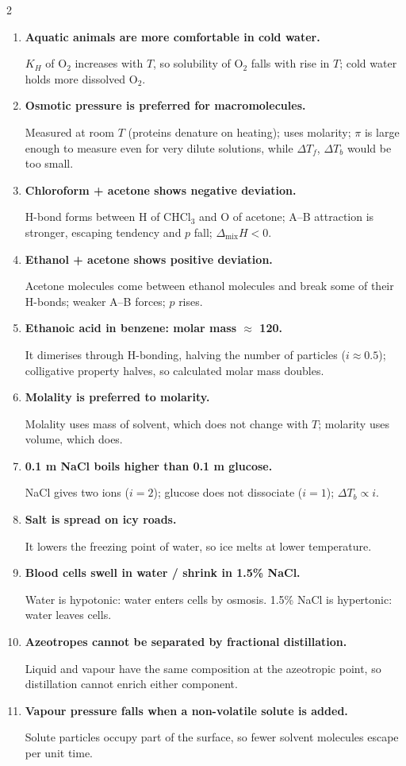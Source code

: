 \documentclass[10pt,a4paper]{extarticle}
\newenvironment{rqlist}{\begin{enumerate}[leftmargin=12pt,label={\sffamily\bfseries\scriptsize\color{uc}\arabic*.},itemsep=1pt]}{\end{enumerate}}
\newcommand{\ans}{\par\hspace*{2pt}{\color{uc}$\hookrightarrow$}\;}
\begin{document}
\begin{multicols}{2}
\begin{rqlist}
\item \textbf{Aquatic animals are more comfortable in cold water.}\ans $K_H$ of O$_2$ increases with $T$, so solubility of O$_2$ falls with rise in $T$; cold water holds more dissolved O$_2$.
\item \textbf{Osmotic pressure is preferred for macromolecules.}\ans Measured at room $T$ (proteins denature on heating); uses molarity; $\pi$ is large enough to measure even for very dilute solutions, while $\Delta T_f$, $\Delta T_b$ would be too small.
\item \textbf{Chloroform + acetone shows negative deviation.}\ans H-bond forms between H of CHCl$_3$ and O of acetone; A--B attraction is stronger, escaping tendency and $p$ fall; $\Delta_\text{mix}H<0$.
\item \textbf{Ethanol + acetone shows positive deviation.}\ans Acetone molecules come between ethanol molecules and break some of their H-bonds; weaker A--B forces; $p$ rises.
\item \textbf{Ethanoic acid in benzene: molar mass $\approx$ 120.}\ans It dimerises through H-bonding, halving the number of particles ($i\approx0.5$); colligative property halves, so calculated molar mass doubles.
\item \textbf{Molality is preferred to molarity.}\ans Molality uses mass of solvent, which does not change with $T$; molarity uses volume, which does.
\item \textbf{0.1 m NaCl boils higher than 0.1 m glucose.}\ans NaCl gives two ions ($i=2$); glucose does not dissociate ($i=1$); $\Delta T_b\propto i$.
\item \textbf{Salt is spread on icy roads.}\ans It lowers the freezing point of water, so ice melts at lower temperature.
\item \textbf{Blood cells swell in water / shrink in 1.5\% NaCl.}\ans Water is hypotonic: water enters cells by osmosis. 1.5\% NaCl is hypertonic: water leaves cells.
\item \textbf{Azeotropes cannot be separated by fractional distillation.}\ans Liquid and vapour have the same composition at the azeotropic point, so distillation cannot enrich either component.
\item \textbf{Vapour pressure falls when a non-volatile solute is added.}\ans Solute particles occupy part of the surface, so fewer solvent molecules escape per unit time.
\end{rqlist}


\end{multicols}
\end{document}
